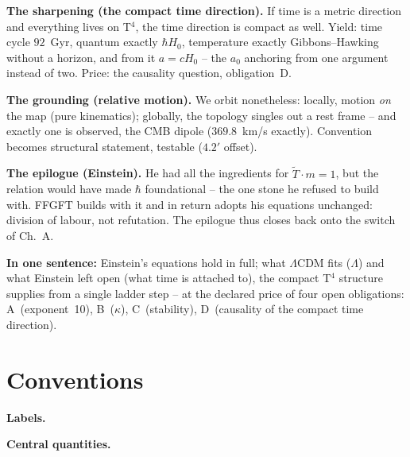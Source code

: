 \textbf{The sharpening (the compact time direction).} If time is
a metric direction and everything lives on T$^4$, the time
direction is compact as well. Yield: time cycle $92$~Gyr, quantum
exactly $\hbar H_0$, temperature exactly Gibbons--Hawking without
a horizon, and from it $a = cH_0$ -- the $a_0$ anchoring from one
argument instead of two. Price: the causality question,
obligation~D.

\textbf{The grounding (relative motion).} We orbit nonetheless:
locally, motion \emph{on} the map (pure kinematics); globally,
the topology singles out a rest frame -- and exactly one is
observed, the CMB dipole ($369.8$~km/s exactly). Convention
becomes structural statement, testable ($4.2'$ offset).

\textbf{The epilogue (Einstein).} He had all the ingredients for
$\tilde T \cdot m = 1$, but the relation would have made $\hbar$
foundational -- the one stone he refused to build with. FFGFT
builds with it and in return adopts his equations unchanged:
division of labour, not refutation. The epilogue thus closes back
onto the switch of Ch.~A.

\medskip
\noindent\textbf{In one sentence:} Einstein's equations hold in
full; what $\Lambda$CDM fits ($\Lambda$) and what Einstein left
open (what time is attached to), the compact T$^4$ structure
supplies from a single ladder step -- at the declared price of
four open obligations: A~(exponent~10), B~($\kappa$),
C~(stability), D~(causality of the compact time direction).

\section*{Conventions}

\noindent\textbf{Labels.}

\medskip


\medskip
\noindent\textbf{Central quantities.}

